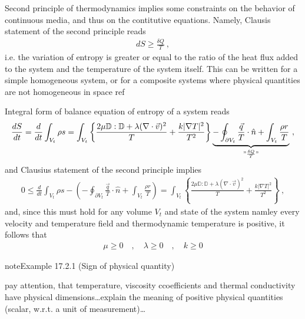 \documentclass[letterpaper,10pt,english]{jupyterBook}
\begin{document}
\sphinxAtStartPar
{} Second principle of thermodynamics implies some constraints on the behavior of continuous media, and thus on the contitutive equations. Namely, Clausis statement of the second principle reads
\begin{equation*}
\begin{split}d S \ge \frac{\delta Q}{T} \ ,\end{split}
\end{equation*}
\sphinxAtStartPar
i.e. the variation of entropy is greater or equal to the ratio of the heat flux added to the system and the temperature of the system itself. This can be written for a simple homogeneous system, or for a composite systems where physical quantities are not homogeneous in space  ref

\sphinxAtStartPar
Integral form of balance equation of entropy of a system reads
\begin{equation*}
\begin{split}\frac{d S}{dt} = \frac{d}{dt} \int_{V_t} \rho s = \int_{V_t} \left\{ \frac{ 2 \mu \mathbb{D} : \mathbb{D} + \lambda (\nabla \cdot \vec{v})^2}{T} + \frac{k |\nabla T|^2}{T^2} \right\} \underbrace{- \oint_{\partial V_t} \frac{\vec{q}}{T} \cdot \hat{n} + \int_{V_t} \frac{\rho r}{T}}_{"\frac{\delta Q}{T}"} \ ,\end{split}
\end{equation*}
\sphinxAtStartPar
and Clausius statement of the second principle implies
\begin{equation*}
\begin{split}0 \le \frac{d}{dt} \int_{V_t} \rho s - \left( - \oint_{\partial V_t} \frac{\vec{q}}{T} \cdot \hat{n} + \int_{V_t} \frac{\rho r}{T} \right) = \int_{V_t} \left\{ \frac{ 2 \mu \mathbb{D} : \mathbb{D} + \lambda (\nabla \cdot \vec{v})^2}{T} + \frac{k |\nabla T|^2}{T^2} \right\} \ ,\end{split}
\end{equation*}
\sphinxAtStartPar
and, since this must hold for any volume \(V_t\) and state of the system \sphinxhyphen{} namley every velocity and temperature field \sphinxhyphen{} and thermodynamic temperature is positive, it follows that
\begin{equation*}
\begin{split}\mu \ge 0 \quad , \quad \lambda \ge 0 \quad , \quad k \ge 0\end{split}
\end{equation*}\label{ch/fluids/governing-equations:example-1}
\begin{sphinxadmonition}{note}{Example 17.2.1 (Sign of physical quantity)}



\sphinxAtStartPar
{} pay attention, that temperature, viscosity ccoefficients and thermal conductivity have physical dimensions…explain the meaning of positive physical quantities (scalar, w.r.t. a unit of measurement)…
\end{sphinxadmonition}
\end{document}
